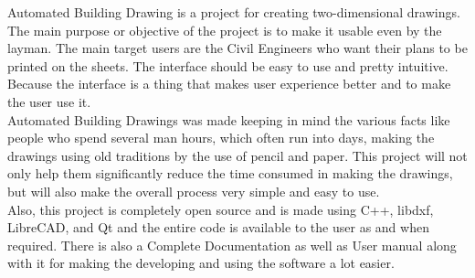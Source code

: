 \begin{Large}
\end{Large}
\vskip 0.1in Automated Building Drawing is a project for creating two-dimensional drawings. The main purpose or objective of the project is to make it usable even by the layman. The main target users are the Civil Engineers who want
their plans to be printed on the sheets. The interface should be easy to use and pretty intuitive. Because the interface
is a thing that makes user experience better and to make the user use it.\\

\noindent Automated Building Drawings was made keeping in mind the various facts like people who spend several man hours, which often run into days, making the drawings using old traditions by the use of pencil and paper. This project will not only help them significantly reduce the time consumed in making the drawings, but will also make the overall process very simple and easy to use.\\

\noindent Also, this project is completely open source and is made using C++, libdxf, LibreCAD, and Qt and the entire code is available to the user as and when required. There is also a Complete Documentation as well as User manual along with it for making the developing and using the software a lot easier.
